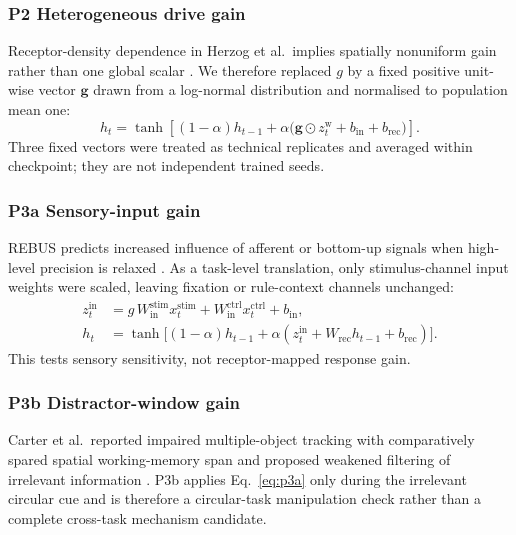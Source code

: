 \documentclass[11pt,reprint,aps,prl,floatfix,secnumarabic]{revtex4-2}
\begin{document}
\subsubsection{P2 Heterogeneous drive gain}
Receptor-density dependence in Herzog et al.\ implies spatially nonuniform gain
rather than one global scalar \cite{herzog2023}. We therefore replaced $g$ by a
fixed positive unit-wise vector $\mathbf{g}$ drawn from a log-normal
distribution and normalised to population mean one:
\begin{equation}
 h_t=\tanh\!\left[
 (1-\alpha)h_{t-1}+\alpha\bigl(\mathbf{g}\odot z_t^{\mathrm{w}}+b_{\mathrm{in}}+b_{\mathrm{rec}}\bigr)
 \right].
 \label{eq:p2}
\end{equation}
Three fixed vectors were treated as technical replicates and averaged within
checkpoint; they are not independent trained seeds.

\subsubsection{P3a Sensory-input gain}
REBUS predicts increased influence of afferent or bottom-up signals when
high-level precision is relaxed \cite{carhartharris2019}. As a task-level
translation, only stimulus-channel input weights were scaled, leaving fixation
or rule-context channels unchanged:
\begin{equation}
\begin{aligned}
 z_t^{\mathrm{in}} &=
 g\,W_{\mathrm{in}}^{\mathrm{stim}}x_t^{\mathrm{stim}}
 +W_{\mathrm{in}}^{\mathrm{ctrl}}x_t^{\mathrm{ctrl}}
 +b_{\mathrm{in}},\\
 h_t &= \tanh\bigl[(1-\alpha)h_{t-1}
 +\alpha(z_t^{\mathrm{in}}+W_{\mathrm{rec}}h_{t-1}+b_{\mathrm{rec}})\bigr].
\end{aligned}
 \label{eq:p3a}
\end{equation}
This tests sensory sensitivity, not receptor-mapped response gain.

\subsubsection{P3b Distractor-window gain}
Carter et al.\ reported impaired multiple-object tracking with comparatively
spared spatial working-memory span and proposed weakened filtering of irrelevant
information \cite{carter2005}. P3b applies Eq.~\eqref{eq:p3a} only during the
irrelevant circular cue and is therefore a circular-task manipulation check
rather than a complete cross-task mechanism candidate.
\end{document}
